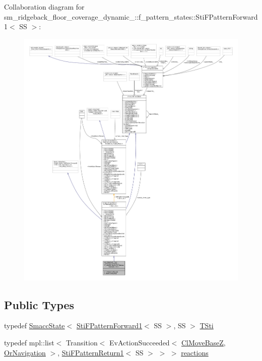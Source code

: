 Collaboration diagram for sm\+\_\+ridgeback\+\_\+floor\+\_\+coverage\+\_\+dynamic\+\_\+:\+:f\+\_\+pattern\+\_\+states\+:\+:Sti\+F\+Pattern\+Forward1$<$ SS $>$\+:
\nopagebreak
\begin{figure}[H]
\begin{center}
\leavevmode
\includegraphics[width=350pt]{structsm__ridgeback__floor__coverage__dynamic__1_1_1f__pattern__states_1_1StiFPatternForward1__coll__graph}
\end{center}
\end{figure}
\subsection*{Public Types}
\begin{DoxyCompactItemize}
\item 
typedef \hyperlink{classSmaccState}{Smacc\+State}$<$ \hyperlink{structsm__ridgeback__floor__coverage__dynamic__1_1_1f__pattern__states_1_1StiFPatternForward1}{Sti\+F\+Pattern\+Forward1}$<$ SS $>$, SS $>$ \hyperlink{structsm__ridgeback__floor__coverage__dynamic__1_1_1f__pattern__states_1_1StiFPatternForward1_a4fc6ee65990cb3ac1ec6d448d2a1ca4c}{T\+Sti}
\item 
typedef mpl\+::list$<$ Transition$<$ Ev\+Action\+Succeeded$<$ \hyperlink{classcl__move__base__z_1_1ClMoveBaseZ}{Cl\+Move\+BaseZ}, \hyperlink{classsm__ridgeback__floor__coverage__dynamic__1_1_1OrNavigation}{Or\+Navigation} $>$, \hyperlink{structsm__ridgeback__floor__coverage__dynamic__1_1_1f__pattern__states_1_1StiFPatternReturn1}{Sti\+F\+Pattern\+Return1}$<$ SS $>$ $>$ $>$ \hyperlink{structsm__ridgeback__floor__coverage__dynamic__1_1_1f__pattern__states_1_1StiFPatternForward1_a6c1b9c5967a72ecd7dd8cc57d1f8566a}{reactions}
\end{DoxyCompactItemize}
